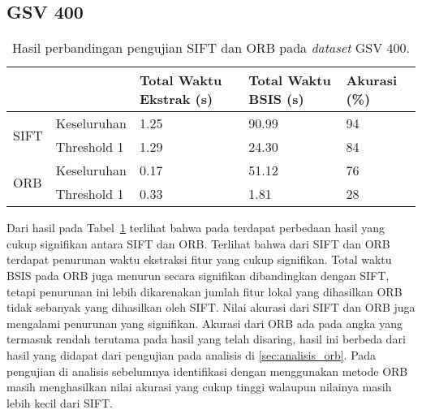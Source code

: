\subsection{GSV 400}
\begin{table}[H]
	\centering
	\begin{tabular}{|l|l|l|l|l|}
		\hline
		&             & \textbf{Total Waktu Ekstrak (s)} & \textbf{Total Waktu BSIS (s)} & \textbf{Akurasi (\%)} \\ \hline
		\multicolumn{1}{|c|}{\multirow{2}{*}{SIFT}} & Keseluruhan & 1.25                             & 90.99                         & 94                    \\ \cline{2-5} 
		\multicolumn{1}{|c|}{}                      & Threshold 1 & 1.29                             & 24.30                         & 84                    \\ \hline
		\multirow{2}{*}{ORB}                        & Keseluruhan & 0.17                             & 51.12                         & 76                    \\ \cline{2-5} 
		& Threshold 1 & 0.33                             & 1.81                          & 28                    \\ \hline
	\end{tabular}
	\caption{Hasil perbandingan pengujian SIFT dan ORB pada \textit{dataset} GSV 400.}
	\label{tab:perbandingan_gsv400}
\end{table}
Dari hasil pada Tabel~\ref{tab:perbandingan_gsv400} terlihat bahwa pada terdapat perbedaan hasil yang cukup signifikan antara SIFT dan ORB. Terlihat bahwa dari SIFT dan ORB terdapat penurunan waktu ekstraksi fitur yang cukup signifikan. Total waktu BSIS pada ORB juga menurun secara signifikan dibandingkan dengan SIFT, tetapi penurunan ini lebih dikarenakan jumlah fitur lokal yang dihasilkan ORB tidak sebanyak yang dihasilkan oleh SIFT. Nilai akurasi dari SIFT dan ORB juga mengalami penurunan yang signifikan. Akurasi dari ORB ada pada angka yang termasuk rendah terutama pada hasil yang telah disaring, hasil ini berbeda dari hasil yang didapat dari pengujian pada analisis di \ref{sec:analisis_orb}. Pada pengujian di analisis sebelumnya identifikasi dengan menggunakan metode ORB masih menghasilkan nilai akurasi yang cukup tinggi walaupun nilainya masih lebih kecil dari SIFT.

